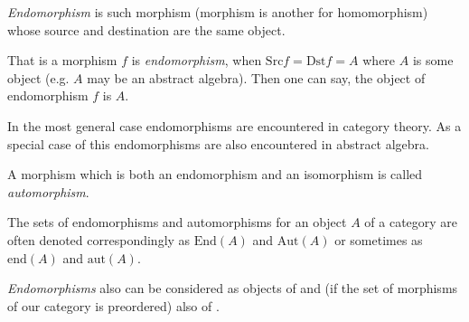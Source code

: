 \documentclass[12pt]{article}
\begin{document}
\emph{Endomorphism} is such morphism (morphism is another  for homomorphism) whose source and destination are the same object.

That is a morphism $f$ is \emph{endomorphism}, when $\mathrm{Src}f=\mathrm{Dst}f=A$ where $A$ is some object (e.g. $A$ may be an abstract algebra). Then one can say, the object of endomorphism $f$ is $A$.

In the most general case endomorphisms are encountered in category theory. As a special case of this endomorphisms are also encountered in abstract algebra.

A morphism which is both an endomorphism and an isomorphism is called \emph{automorphism}.

The sets of endomorphisms and automorphisms for an object $A$ of a category are often denoted correspondingly as $\mathrm{End}(A)$ and $\mathrm{Aut}(A)$ or sometimes as $\mathrm{end}(A)$ and $\mathrm{aut}(A)$.

\emph{Endomorphisms} also can be considered as objects of  and (if the set of morphisms of our category is preordered) also of .
\end{document}
